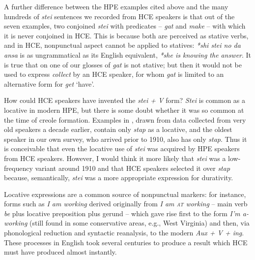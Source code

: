 A further difference between the HPE examples cited above and the many hundreds of \textit{stei} sentences we recorded from HCE speakers is that out of the seven examples, two conjoined \textit{stei} with predicates -- \textit{gat} and \textit{make} -- with which it is never conjoined in HCE. This is because both are perceived as stative verbs, and in HCE, nonpunctual aspect cannot be applied to statives: \textit{*shi stei no da ansa} is as ungrammatical as its English equivalent, \textit{*she is knowing the answer}. It is true that on one of our glosses of  \textit{gat} is not stative; but then it would not be used to express \textit{collect} by an HCE speaker, for whom \textit{gat} is limited to an alternative form for \textit{get} `have'.

How could HCE speakers have invented the \textit{stei + V} form? \textit{Stei} is common as a locative in modern HPE, but there is some doubt whether it was so common at the time of creole formation. Examples in \citet{Nagara1972}, drawn from data collected from very old speakers a decade earlier, contain only \textit{stap} as a locative, and the oldest speaker in our own survey, who arrived prior to 1910, also has only \textit{stap}. Thus it is conceivable that even the locative use of \textit{stei} was acquired by HPE speakers from HCE speakers. However, I would think it more likely that \textit{stei} was a low-frequency variant around 1910 and that HCE speakers selected it over \textit{stap} because, semantically, \textit{stei} was a more appropriate expression for durativity.

Locative expressions are a common source of nonpunctual markers: for instance, forms such as \textit{I am working} derived originally from \textit{I am \textsc{at} working} -- main verb \textit{be} plus locative preposition plus
gerund -- which gave rise first to the form \textit{I'm a-working} (still found in some conservative areas, e.g., West Virginia) and then, via phonological reduction and syntactic reanalysis, to the modern \textit{Aux + V + ing}. These processes in English took several centuries to produce a result which HCE must have produced almost instantly.


